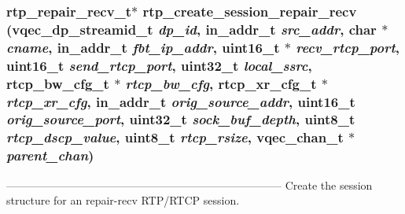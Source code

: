 \subsubsection{\setlength{\rightskip}{0pt plus 5cm}\bf{rtp\_\-repair\_\-recv\_\-t}$\ast$ rtp\_\-create\_\-session\_\-repair\_\-recv (vqec\_\-dp\_\-streamid\_\-t {\em dp\_\-id}, in\_\-addr\_\-t {\em src\_\-addr}, char $\ast$ {\em cname}, in\_\-addr\_\-t {\em fbt\_\-ip\_\-addr}, uint16\_\-t $\ast$ {\em recv\_\-rtcp\_\-port}, uint16\_\-t {\em send\_\-rtcp\_\-port}, uint32\_\-t {\em local\_\-ssrc}, rtcp\_\-bw\_\-cfg\_\-t $\ast$ {\em rtcp\_\-bw\_\-cfg}, rtcp\_\-xr\_\-cfg\_\-t $\ast$ {\em rtcp\_\-xr\_\-cfg}, in\_\-addr\_\-t {\em orig\_\-source\_\-addr}, uint16\_\-t {\em orig\_\-source\_\-port}, uint32\_\-t {\em sock\_\-buf\_\-depth}, uint8\_\-t {\em rtcp\_\-dscp\_\-value}, uint8\_\-t {\em rtcp\_\-rsize}, \bf{vqec\_\-chan\_\-t} $\ast$ {\em parent\_\-chan})}\label{rtp__repair__recv_8h_9b43f7ef4ddeef46e843fbf5ab074634}


--------------------------------------------------------------------------- Create the session structure for an repair-recv RTP/RTCP session.

